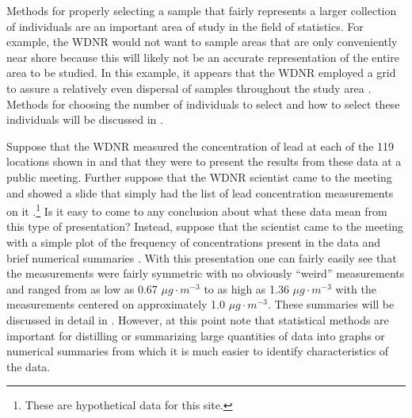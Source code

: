 \documentclass[10pt,openany]{book}\usepackage[]{graphicx}\usepackage[]{color}
\begin{document}
Methods for properly selecting a sample that fairly represents a larger collection of individuals are an important area of study in the field of statistics.  For example, the WDNR would not want to sample areas that are only conveniently near shore because this will likely not be an accurate representation of the entire area to be studied.  In this example, it appears that the WDNR employed a grid to assure a relatively even dispersal of samples throughout the study area .  Methods for choosing the number of individuals to select and how to select these individuals will be discussed in .


Suppose that the WDNR measured the concentration of lead at each of the 119 locations shown in  and that they were to present the results from these data at a public meeting.  Further suppose that the WDNR scientist came to the meeting and showed a slide that simply had the list of lead concentration measurements on it .\footnote{These are hypothetical data for this site.}  Is it easy to come to any conclusion about what these data mean from this type of presentation?  Instead, suppose that the scientist came to the meeting with a simple plot of the frequency of concentrations present in the data and brief numerical summaries .  With this presentation one can fairly easily see that the measurements were fairly symmetric with no obviously ``weird'' measurements and ranged from as low as 0.67 $\mu g \cdot m^{-3}$ to as high as 1.36 $\mu g \cdot m^{-3}$ with the measurements centered on approximately 1.0 $\mu g \cdot m^{-3}$.  These summaries will be discussed in detail in .  However, at this point note that statistical methods are important for distilling or summarizing large quantities of data into graphs or numerical summaries from which it is much easier to identify characteristics of the data.
\end{document}
